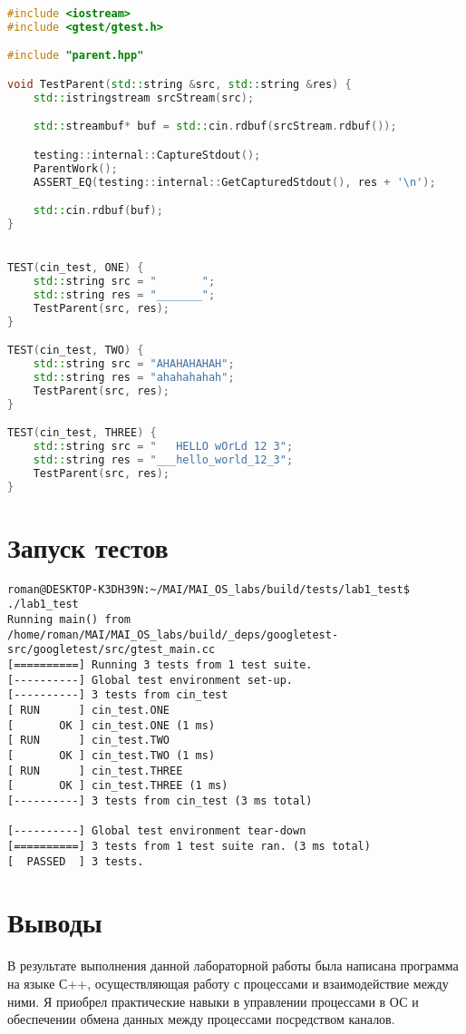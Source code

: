 \documentclass[a4paper, 12pt]{article}
\begin{document}
\begin{lstlisting}[language=C++]
#include <iostream>
#include <gtest/gtest.h>

#include "parent.hpp"

void TestParent(std::string &src, std::string &res) {
    std::istringstream srcStream(src);

    std::streambuf* buf = std::cin.rdbuf(srcStream.rdbuf());

    testing::internal::CaptureStdout();
    ParentWork(); 
    ASSERT_EQ(testing::internal::GetCapturedStdout(), res + '\n'); 

    std::cin.rdbuf(buf);
}


TEST(cin_test, ONE) {
    std::string src = "       ";
    std::string res = "_______";
    TestParent(src, res);
}

TEST(cin_test, TWO) {
    std::string src = "AHAHAHAHAH";
    std::string res = "ahahahahah";
    TestParent(src, res);
}

TEST(cin_test, THREE) {
    std::string src = "   HELLO wOrLd 12 3";
    std::string res = "___hello_world_12_3";
    TestParent(src, res);
}

\end{lstlisting}

\newpage
\section{Запуск тестов}
\begin{verbatim}
roman@DESKTOP-K3DH39N:~/MAI/MAI_OS_labs/build/tests/lab1_test$ ./lab1_test 
Running main() from /home/roman/MAI/MAI_OS_labs/build/_deps/googletest-src/googletest/src/gtest_main.cc
[==========] Running 3 tests from 1 test suite.
[----------] Global test environment set-up.
[----------] 3 tests from cin_test
[ RUN      ] cin_test.ONE
[       OK ] cin_test.ONE (1 ms)
[ RUN      ] cin_test.TWO
[       OK ] cin_test.TWO (1 ms)
[ RUN      ] cin_test.THREE
[       OK ] cin_test.THREE (1 ms)
[----------] 3 tests from cin_test (3 ms total)

[----------] Global test environment tear-down
[==========] 3 tests from 1 test suite ran. (3 ms total)
[  PASSED  ] 3 tests.
\end{verbatim}
\newpage
\section{Выводы}

В результате выполнения данной лабораторной работы была написана программа на языке С++, осуществляющая работу с процессами и 
взаимодействие между ними. Я приобрел практические навыки в управлении процессами в ОС и обеспечении обмена данных между процессами посредством каналов.
\end{document}
